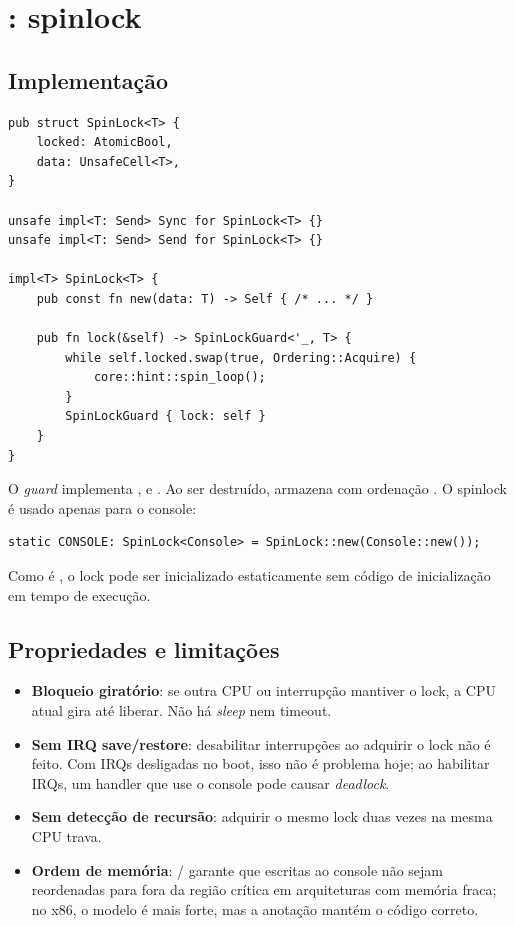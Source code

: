 \section{: spinlock}

\subsection{Implementa\c{c}\~ao}

\begin{lstlisting}[caption={Spinlock com \code{AtomicBool}.},label={lst:spinlock}]
pub struct SpinLock<T> {
    locked: AtomicBool,
    data: UnsafeCell<T>,
}

unsafe impl<T: Send> Sync for SpinLock<T> {}
unsafe impl<T: Send> Send for SpinLock<T> {}

impl<T> SpinLock<T> {
    pub const fn new(data: T) -> Self { /* ... */ }

    pub fn lock(&self) -> SpinLockGuard<'_, T> {
        while self.locked.swap(true, Ordering::Acquire) {
            core::hint::spin_loop();
        }
        SpinLockGuard { lock: self }
    }
}
\end{lstlisting}

O \emph{guard} implementa ,  e . Ao ser
destru\'ido, armazena  com ordena\c{c}\~ao . O
spinlock \'e usado apenas para o console:

\begin{lstlisting}[caption={Console global protegido por spinlock.},label={lst:consoleglobal}]
static CONSOLE: SpinLock<Console> = SpinLock::new(Console::new());
\end{lstlisting}

Como  \'e , o lock pode ser inicializado
estaticamente sem c\'odigo de inicializa\c{c}\~ao em tempo de execu\c{c}\~ao.

\subsection{Propriedades e limita\c{c}\~oes}

\begin{itemize}
  \item \textbf{Bloqueio girat\'orio}: se outra CPU ou interrup\c{c}\~ao
        mantiver o lock, a CPU atual gira at\'e liberar. N\~ao h\'a
        \emph{sleep} nem timeout.
  \item \textbf{Sem IRQ save/restore}: desabilitar interrup\c{c}\~oes ao
        adquirir o lock n\~ao \'e feito. Com IRQs desligadas no boot, isso
        n\~ao \'e problema hoje; ao habilitar IRQs, um handler que use o
        console pode causar \emph{deadlock}.
  \item \textbf{Sem detec\c{c}\~ao de recurs\~ao}: adquirir o mesmo lock duas
        vezes na mesma CPU trava.
  \item \textbf{Ordem de mem\'oria}: / garante
        que escritas ao console n\~ao sejam reordenadas para fora da
        regi\~ao cr\'itica em arquiteturas com mem\'oria fraca; no x86,
        o modelo \'e mais forte, mas a anota\c{c}\~ao mant\'em o c\'odigo
        correto.
\end{itemize}

